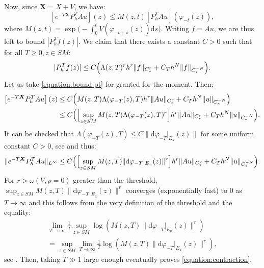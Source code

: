 \documentclass[10pt]{amsart}
\newcommand{\dd}{\mathrm{d}}
\newcommand{\X}{\boldsymbol{X}}
\theoremstyle{plain}
\theoremstyle{definition}
\begin{document}
Now, since $\X = X+V$, we have:
\begin{equation}
\label{equation:prop}
\left[e^{-T \X} P_h^T A u\right](z) \leq M(z,t) \left[ P_h^T Au\right](\varphi_{-t}(z)),
\end{equation}
where $M(z,t) = \exp\bigl(- \int_0^t V(\varphi_{-t+s}(z)) \dd s\bigr)$. Writing $f=Au$, we are thus left to bound $|P_h^T f(z)|$. We claim that there exists a constant $C > 0$ such that for all $T \geq 0,z \in SM$:
\begin{equation}
\label{equation:bound-pt}
|P_h^T f(z)| \leq C \Bigl(\Lambda(z,T)^r h^r \|f\|_{C^r_*} + C_T h^N \|f\|_{C^{-N}_*}\Bigr).
\end{equation}
Let us take \eqref{equation:bound-pt} for granted for the moment. Then:
\[
\begin{split}
\left[e^{-T \X} P_h^T A u\right](z) & \leq C \Bigl( M(z,T) \Lambda(\varphi_{-T}(z),T) h^r \|Au\|_{C^r_*} + C_T h^N \|u\|_{C^{-N}_*} \Bigr) \\
& \leq C \Bigl( \Bigl[\sup_{z \in SM} M(z,T) \Lambda(\varphi_{-T}(z),T)^r\Bigr] h^r \|Au\|_{C^r_*} + C_T h^N \|u\|_{C^{-N}_*} \Bigr).
\end{split}
\]
It can be checked that $\Lambda(\varphi_{-T}(z),T) \leq C \|\dd \varphi_{-T}|_{E_u}(z)\|$ for some uniform constant $C > 0$, see \cite[Step 2 in the proof of Th.\,3.2]{Bonthonneau-Lefeuvre-21} and thus:
\[
\|e^{-T \X} P_h^T A u\|_{L^\infty}\leq C \Bigl( \Bigl[\sup_{z \in SM} M(z,T) \|\dd \varphi_{-T}|_{E_u}(z)\|^r\Bigr] h^r \|Au\|_{C^r_*} + C_T h^N \|u\|_{C^{-N}_*} \Bigr).
\]
For $r > \omega(V,\rho=0)$ greater than the threshold, $\sup_{z \in SM} M(z,T) \|\dd \varphi_{-T}|_{E_u}(z)\|^r$ converges (exponentially fast) to $0$ as $T \to \infty$ and this follows from the very definition of the threshold and the equality:
\begin{multline*}
\lim_{T \to \infty} \frac{1}{T} \sup_{z \in SM} \log(M(z,T) \|\dd \varphi_{-T}|_{E_u}(z)\|^r) \\[-5pt]
= \sup_{z \in SM} \lim_{T \to \infty} \frac{1}{T} \log(M(z,T) \|\dd \varphi_{-T}|_{E_u}(z)\|^r),
\end{multline*}
see \cite[App.\,A]{Bonthonneau-Lefeuvre-21}. Then, taking $T \gg 1$ large enough eventually proves \eqref{equation:contraction}.
\end{document}

